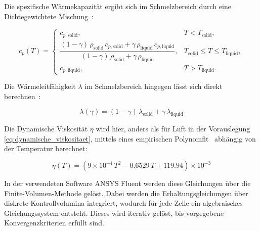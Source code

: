 Die spezifische Wärmekapazität ergibt sich im Schmelzbereich durch eine Dichtegewichtete Mischung~\cite{akamcae-udf}:

\begin{equation}
  \label{eq:udf_cp}
    c_p(T)=
  \begin{cases}
    c_{p,\mathrm{solid}}, & T < T_\mathrm{solid},\\[6pt]
    \dfrac{(1-\gamma)\,\rho_\mathrm{solid}\,c_{p,\mathrm{solid}} + \gamma\,\rho_\mathrm{liquid}\,c_{p,\mathrm{liquid}}}
          {(1-\gamma)\,\rho_\mathrm{solid} + \gamma\,\rho_\mathrm{liquid}}, & T_\mathrm{solid} \le T \le T_\mathrm{liquid},\\[12pt]
    c_{p,\mathrm{liquid}}, & T > T_\mathrm{liquid}.
  \end{cases}
\end{equation}

Die Wärmeleitfähigkeit $\lambda$ im Schmelzbereich hingegen lässt sich direkt berechnen~\cite{akamcae-udf}:

\begin{equation}
  \label{eq:udf_lambda}
  \lambda(\gamma)= (1-\gamma)\,\lambda_{\mathrm{solid}} + \gamma\,\lambda_{\mathrm{liquid}}
\end{equation}

Die Dynamische Viskosität $\eta$ wird hier, anders als für Luft in der Vorauslegung \ref{eq:dynamische_viskositaet}, mittels eines empirischen
Polynomfit~\cite{akamcae-udf} abhängig von der Temperatur berechnet:

\begin{equation}
  \label{eq:udf_mu}
  \eta(T)= \left(9\times 10^{-4}\,T^{2} - 0.6529\,T + 119.94\right)\times 10^{-3}
\end{equation}

In der verwendeten Software ANSYS Fluent werden diese Gleichungen über die Finite-Volumen-Methode gelöst. Dabei werden die Erhaltungsgleichungen
über diskrete Kontrollvolumina integriert, wodurch für jede Zelle ein algebraisches Gleichungssystem entsteht. Dieses
wird iterativ gelöst, bis vorgegebene Konvergenzkriterien erfüllt sind.